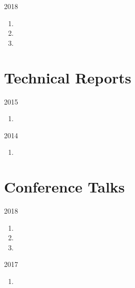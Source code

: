 \begin{paracol}{2}
  \textsc{2018}
\switchcolumn
    \begin{enumerate}
      \setcounter{enumi}{\thepubcounter}
      \item {}
      \item {}
      \item {}
      \setcounter{pubcounter}{\theenumi}
    \end{enumerate}
\end{paracol}

\section*{Technical Reports}

\begin{paracol}{2}
  \textsc{2015}
\switchcolumn
  \begin{enumerate}
    \setcounter{enumi}{\thepubcounter}
    \item {}
    \setcounter{pubcounter}{\theenumi}
  \end{enumerate}
\end{paracol}

\begin{paracol}{2}
  \textsc{2014}
\switchcolumn
  \begin{enumerate}
    \setcounter{enumi}{\thepubcounter}
    \item {}
    \setcounter{pubcounter}{\theenumi}
  \end{enumerate}
\end{paracol}

\section*{Conference Talks}

\begin{paracol}{2}
  \textsc{2018}
\switchcolumn
  \begin{enumerate}
    \setcounter{enumi}{\thepubcounter}
    \item {}
    \item {}
    \item {}
    \setcounter{pubcounter}{\theenumi}
  \end{enumerate}
\end{paracol}

\begin{paracol}{2}
  \textsc{2017}
\switchcolumn
  \begin{enumerate}
    \setcounter{enumi}{\thepubcounter}
    \item {}
    \setcounter{pubcounter}{\theenumi}
  \end{enumerate}
\end{paracol}

